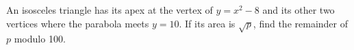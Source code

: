 An isosceles triangle has its apex at the vertex of $y=x^2-8$ and its other two vertices where the parabola meets $y=10$. If its area is $\sqrt p$, find the remainder of $p$ modulo 100.
